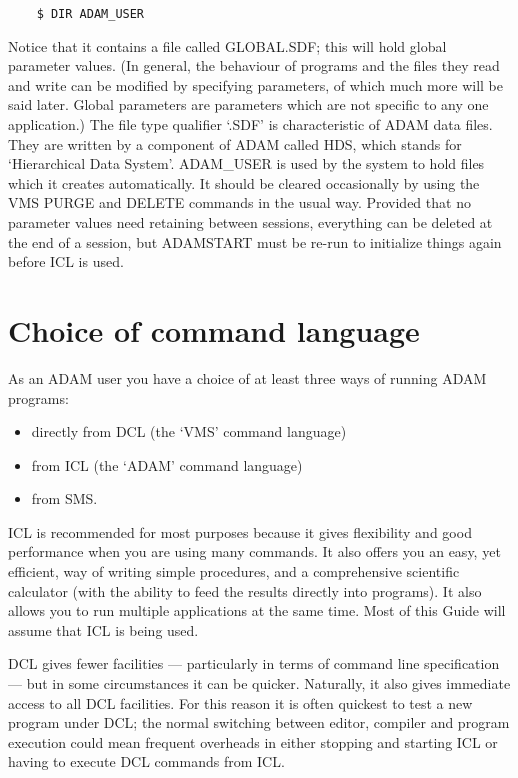\begin{small}
\begin{verbatim}
    $ DIR ADAM_USER
\end{verbatim}
\end{small}

Notice that it contains a file called GLOBAL.SDF; this will hold global
parameter values.
(In general, the behaviour of programs and the files they read and write can
be modified by specifying parameters, of which much more will be said later.
Global parameters are parameters which are not specific to any one application.)
The file type qualifier `.SDF' is characteristic of ADAM data files.
They are written by a component of ADAM called HDS, which stands for
`Hierarchical Data System'.
ADAM\_USER is used by the system to hold files which it creates automatically.
It should be cleared occasionally by using the VMS PURGE and DELETE commands
in the usual way.
Provided that no parameter values need retaining between sessions, everything
can be deleted at the end of a session, but ADAMSTART must be re-run to
initialize things again before ICL is used.

\section{Choice of command language}
\label{S_comlang}

As an ADAM user you have a choice of at least three ways of running ADAM
programs:
\begin{itemize}
\item directly from DCL (the `VMS' command language)
\item from ICL (the `ADAM' command language)
\item from SMS.
\end{itemize}
ICL is recommended for most purposes because it gives flexibility and good 
performance when you are using many commands.
It also offers you an easy, yet efficient, way of writing simple procedures,
and a comprehensive scientific calculator (with the ability to feed the results
directly into programs). 
It also allows you to run multiple applications at the same time.
Most of this Guide will assume that ICL is being used.

DCL gives fewer facilities --- particularly in terms of command line
specification --- but in some circumstances it can be quicker.
Naturally, it also gives immediate access to all DCL facilities.
For this reason it is often quickest to test a new program under DCL; the
normal switching between editor, compiler and program execution could mean
frequent overheads in either stopping and starting ICL or having to execute
DCL commands from ICL.

